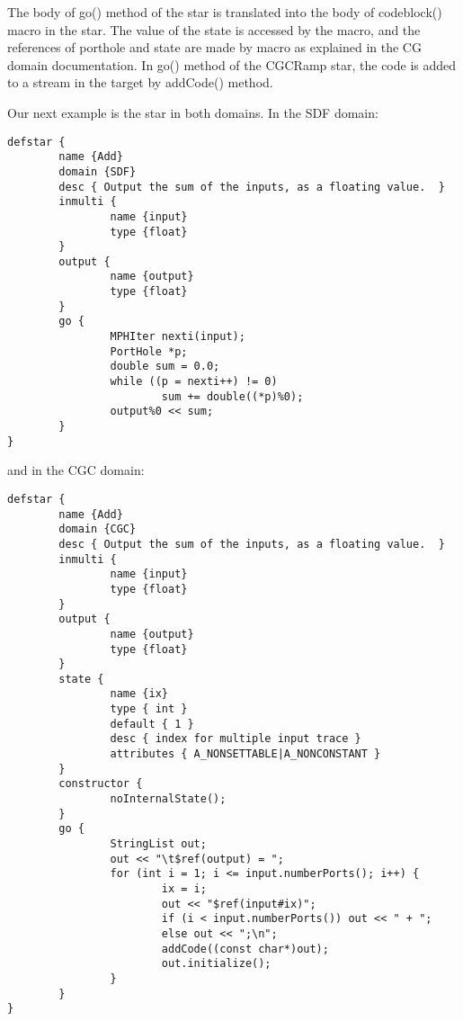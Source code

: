 \begin{ignore}
The body of go() method of the 
star is translated into
the body of codeblock() macro in the 
star. The value of
the state  is accessed by the 
macro, and the references of porthole 
and state
are made by
macro as explained in the CG domain documentation. In go() method
of the CGCRamp star, the code is added to a stream in the target
by addCode() method.

Our next example is the 
star in both domains. In the SDF domain:

\begin{verbatim}
defstar {
        name {Add}
        domain {SDF}
        desc { Output the sum of the inputs, as a floating value.  }
        inmulti {
                name {input}
                type {float}
        }
        output {
                name {output}
                type {float}
        }
        go {
                MPHIter nexti(input);
                PortHole *p;
                double sum = 0.0;
                while ((p = nexti++) != 0)
                        sum += double((*p)%0);
                output%0 << sum;
        }
}
\end{verbatim}

and in the CGC domain:

\begin{verbatim}
defstar {
        name {Add}
        domain {CGC}
        desc { Output the sum of the inputs, as a floating value.  }
        inmulti {
                name {input}
                type {float}
        }
        output {
                name {output}
                type {float}
        }
        state {
                name {ix}
                type { int }
                default { 1 }
                desc { index for multiple input trace }
                attributes { A_NONSETTABLE|A_NONCONSTANT }
        }
        constructor {
                noInternalState();
        }
        go {
                StringList out;
                out << "\t$ref(output) = ";
                for (int i = 1; i <= input.numberPorts(); i++) {
                        ix = i;
                        out << "$ref(input#ix)";
                        if (i < input.numberPorts()) out << " + ";
                        else out << ";\n";
                        addCode((const char*)out);
                        out.initialize();
                }
        }
}
\end{verbatim}


\end{ignore}
